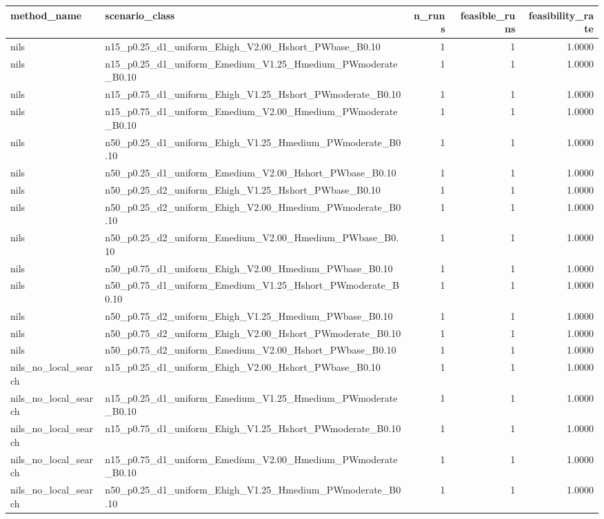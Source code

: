 \begin{tabular}{llrrr}
\toprule
method_name & scenario_class & n_runs & feasible_runs & feasibility_rate \\
\midrule
nils & n15_p0.25_d1_uniform_Ehigh_V2.00_Hshort_PWbase_B0.10 & 1 & 1 & 1.0000 \\
nils & n15_p0.25_d1_uniform_Emedium_V1.25_Hmedium_PWmoderate_B0.10 & 1 & 1 & 1.0000 \\
nils & n15_p0.75_d1_uniform_Ehigh_V1.25_Hshort_PWmoderate_B0.10 & 1 & 1 & 1.0000 \\
nils & n15_p0.75_d1_uniform_Emedium_V2.00_Hmedium_PWmoderate_B0.10 & 1 & 1 & 1.0000 \\
nils & n50_p0.25_d1_uniform_Ehigh_V1.25_Hmedium_PWmoderate_B0.10 & 1 & 1 & 1.0000 \\
nils & n50_p0.25_d1_uniform_Emedium_V2.00_Hshort_PWbase_B0.10 & 1 & 1 & 1.0000 \\
nils & n50_p0.25_d2_uniform_Ehigh_V1.25_Hshort_PWbase_B0.10 & 1 & 1 & 1.0000 \\
nils & n50_p0.25_d2_uniform_Ehigh_V2.00_Hmedium_PWmoderate_B0.10 & 1 & 1 & 1.0000 \\
nils & n50_p0.25_d2_uniform_Emedium_V2.00_Hmedium_PWbase_B0.10 & 1 & 1 & 1.0000 \\
nils & n50_p0.75_d1_uniform_Ehigh_V2.00_Hmedium_PWbase_B0.10 & 1 & 1 & 1.0000 \\
nils & n50_p0.75_d1_uniform_Emedium_V1.25_Hshort_PWmoderate_B0.10 & 1 & 1 & 1.0000 \\
nils & n50_p0.75_d2_uniform_Ehigh_V1.25_Hmedium_PWbase_B0.10 & 1 & 1 & 1.0000 \\
nils & n50_p0.75_d2_uniform_Ehigh_V2.00_Hshort_PWmoderate_B0.10 & 1 & 1 & 1.0000 \\
nils & n50_p0.75_d2_uniform_Emedium_V2.00_Hshort_PWbase_B0.10 & 1 & 1 & 1.0000 \\
nils_no_local_search & n15_p0.25_d1_uniform_Ehigh_V2.00_Hshort_PWbase_B0.10 & 1 & 1 & 1.0000 \\
nils_no_local_search & n15_p0.25_d1_uniform_Emedium_V1.25_Hmedium_PWmoderate_B0.10 & 1 & 1 & 1.0000 \\
nils_no_local_search & n15_p0.75_d1_uniform_Ehigh_V1.25_Hshort_PWmoderate_B0.10 & 1 & 1 & 1.0000 \\
nils_no_local_search & n15_p0.75_d1_uniform_Emedium_V2.00_Hmedium_PWmoderate_B0.10 & 1 & 1 & 1.0000 \\
nils_no_local_search & n50_p0.25_d1_uniform_Ehigh_V1.25_Hmedium_PWmoderate_B0.10 & 1 & 1 & 1.0000 \\

\end{tabular}
